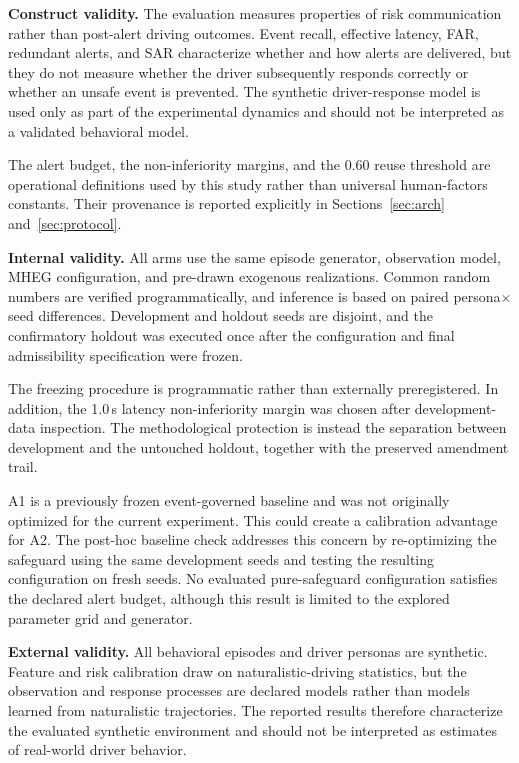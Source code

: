 \documentclass[conference]{IEEEtran}
\begin{document}
\textbf{Construct validity.}
The evaluation measures properties of risk communication rather than
post-alert driving outcomes. Event recall, effective latency, FAR,
redundant alerts, and SAR characterize whether and how alerts are
delivered, but they do not measure whether the driver subsequently
responds correctly or whether an unsafe event is prevented. The synthetic
driver-response model is used only as part of the experimental dynamics
and should not be interpreted as a validated behavioral model.

The alert budget, the non-inferiority margins, and the $0.60$ reuse
threshold are operational definitions used by this study rather than
universal human-factors constants. Their provenance is reported
explicitly in Sections~\ref{sec:arch} and~\ref{sec:protocol}.

\textbf{Internal validity.}
All arms use the same episode generator, observation model, MHEG
configuration, and pre-drawn exogenous realizations. Common random
numbers are verified programmatically, and inference is based on paired
persona$\times$seed differences. Development and holdout seeds are
disjoint, and the confirmatory holdout was executed once after the
configuration and final admissibility specification were frozen.

The freezing procedure is programmatic rather than externally
preregistered. In addition, the 1.0\,s latency non-inferiority margin was
chosen after development-data inspection. The methodological protection
is instead the
separation between development and the untouched holdout, together with
the preserved amendment trail.

A1 is a previously frozen event-governed baseline and was not originally
optimized for the current experiment. This could create a calibration
advantage for A2. The post-hoc baseline check addresses this concern by
re-optimizing the safeguard using the same development seeds and testing
the resulting configuration on fresh seeds. No evaluated pure-safeguard
configuration satisfies the declared alert budget, although this result
is limited to the explored parameter grid and generator.

\textbf{External validity.}
All behavioral episodes and driver personas are synthetic. Feature and
risk calibration draw on naturalistic-driving statistics, but the
observation and response processes are declared models rather than
models learned from naturalistic trajectories. The reported results
therefore characterize the evaluated synthetic environment and should
not be interpreted as estimates of real-world driver behavior.
\end{document}
